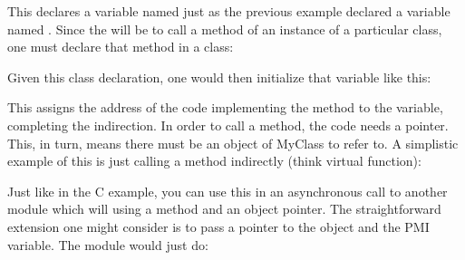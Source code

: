 \documentclass[letterpaper,10pt,english]{sphinxmanual}
\renewcommand{\sphinxcode}[1]{\texttt{\small{#1}}}
\begin{document}
This declares a variable named \sphinxcode{} just as the previous example declared a
variable named \sphinxcode{}. Since the will be to call a method of an instance of a
particular class, one must declare that method in a class:

\begin{sphinxVerbatim}[commandchars=\\\{\}]
  
     
\end{sphinxVerbatim}

Given this class declaration, one would then initialize that variable like
this:

\begin{sphinxVerbatim}[commandchars=\\\{\}]
  
\end{sphinxVerbatim}

This assigns the address of the code implementing the method to the variable,
completing the indirection. In order to call a method, the code needs a \sphinxcode{}
pointer. This, in turn, means there must be an object of MyClass to refer to. A
simplistic example of this is just calling a method indirectly (think virtual
function):

\begin{sphinxVerbatim}[commandchars=\\\{\}]
       
             

                     
               
\end{sphinxVerbatim}

Just like in the C example, you can use this in an asynchronous call to another
module which will  using a method and an object pointer. The
straightforward extension one might consider is to pass a pointer to the object
and the PMI variable. The module would just do:
\end{document}
